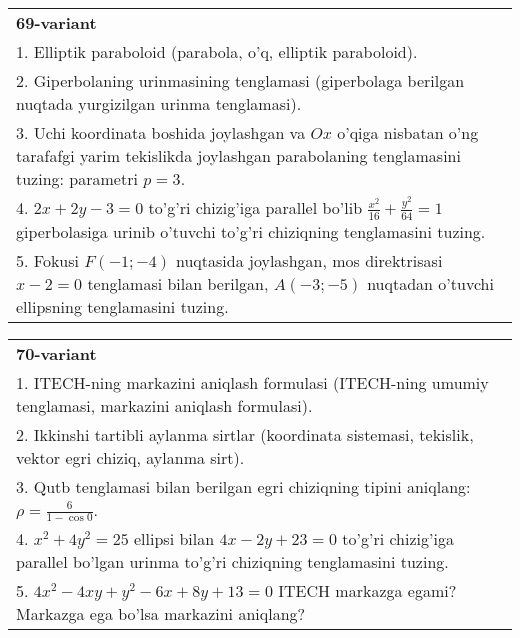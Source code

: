 \documentclass{article}
\begin{document}
\begin{tabular}{m{17cm}}
\textbf{69-variant}\\
1. Elliptik paraboloid (parabola, o'q, elliptik paraboloid).\\

2. Giperbolaning urinmasining tenglamasi (giperbolaga berilgan nuqtada yurgizilgan urinma tenglamasi).\\

3. Uchi koordinata boshida joylashgan va $Ox$ o'qiga nisbatan o'ng tarafafgi yarim tekislikda joylashgan parabolaning tenglamasini tuzing: parametri $p=3$.\\

4. $2x + 2y - 3 = 0$ to'g'ri chizig'iga parallel bo'lib $\frac{x^{2}}{16} + \frac{y^{2}}{64} = 1$ giperbolasiga urinib o'tuvchi to'g'ri chiziqning tenglamasini tuzing.  \\

5. Fokusi $F( - 1; - 4)$ nuqtasida joylashgan, mos direktrisasi $x - 2 = 0$ tenglamasi bilan berilgan, $A( - 3; - 5)$ nuqtadan o'tuvchi ellipsning tenglamasini tuzing.  
\end{tabular}
\vspace{1cm}


\begin{tabular}{m{17cm}}
\textbf{70-variant}\\
1. ITECH-ning markazini aniqlash formulasi (ITECH-ning umumiy tenglamasi, markazini aniqlash formulasi).\\

2. Ikkinshi tartibli aylanma sirtlar (koordinata sistemasi, tekislik, vektor egri chiziq, aylanma sirt).\\

3. Qutb tenglamasi bilan berilgan egri chiziqning tipini aniqlang: $\rho=\frac{6}{1-\cos 0}$.\\

4. $x^{2} + 4y^{2} = 25$ ellipsi bilan $4x - 2y + 23 = 0$ to'g'ri chizig'iga parallel bo'lgan urinma to'g'ri chiziqning tenglamasini tuzing.  \\

5. $4x^{2} - 4xy + y^{2} - 6x + 8y + 13 = 0$ ITECH markazga egami? Markazga ega bo'lsa markazini aniqlang?  
\end{tabular}
\vspace{1cm}
\end{document}
